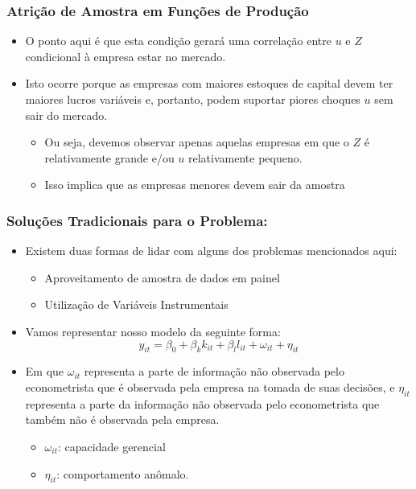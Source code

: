 \documentclass{beamer}
\begin{document}
\begin{frame}\frametitle{Atrição de Amostra em Funções de Produção}

\begin{itemize}
\item O ponto aqui é que esta condição gerará uma correlação entre $u$
e $Z$ condicional à empresa estar no mercado.
\item Isto ocorre porque as empresas com maiores estoques de capital devem
ter maiores lucros variáveis e, portanto, podem suportar piores choques
$u$ sem sair do mercado.

\begin{itemize}
\item Ou seja, devemos observar apenas aquelas empresas em que o $Z$ é
relativamente grande e/ou $u$ relativamente pequeno.
\item Isso implica que as empresas menores devem sair da amostra
\end{itemize}
\end{itemize}
\end{frame}

\begin{frame}\frametitle{Soluções Tradicionais para o Problema:}

\begin{itemize}
\item Existem duas formas de lidar com alguns dos problemas mencionados
aqui:

\begin{itemize}
\item Aproveitamento de amostra de dados em painel
\item Utilização de Variáveis Instrumentais
\end{itemize}
\item Vamos representar nosso modelo da seguinte forma:
\[
y_{it}=\beta_{0}+\beta_{k}k_{it}+\beta_{l}l_{it}+\omega_{it}+\eta_{it}
\]
\item Em que $\omega_{it}$ representa a parte de informação não observada
pelo econometrista que é observada pela empresa na tomada de suas
decisões, e $\eta_{it}$ representa a parte da informação não observada
pelo econometrista que também não é observada pela empresa.

\begin{itemize}
\item $\omega_{it}$: capacidade gerencial
\item $\eta_{it}$: comportamento anômalo.
\end{itemize}
\end{itemize}
\end{frame}
\end{document}
